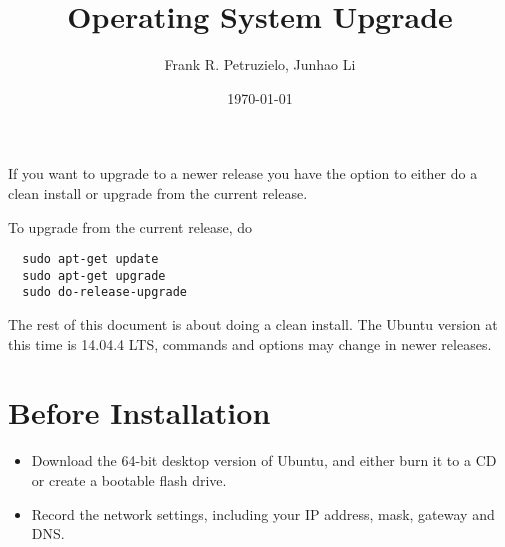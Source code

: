 \documentclass[12pt]{article}
\title{Operating System Upgrade}
\author{Frank R. Petruzielo, Junhao Li}
\date{\today}
\begin{document}
\maketitle

If you want to upgrade to a newer release you have the option to either do a clean install or upgrade from the current release.

To upgrade from the current release, do
\begin{Verbatim}
  sudo apt-get update
  sudo apt-get upgrade
  sudo do-release-upgrade
\end{Verbatim}

The rest of this document is about doing a clean install.
The Ubuntu version at this time is 14.04.4 LTS, commands and options may change in newer releases.

\section{Before Installation}
\begin{itemize}
\item Download the 64-bit desktop version of Ubuntu, and either burn it to a CD or create a bootable flash drive.
\item Record the network settings, including your IP address, mask, gateway and DNS.
\end{itemize}
\end{document}
